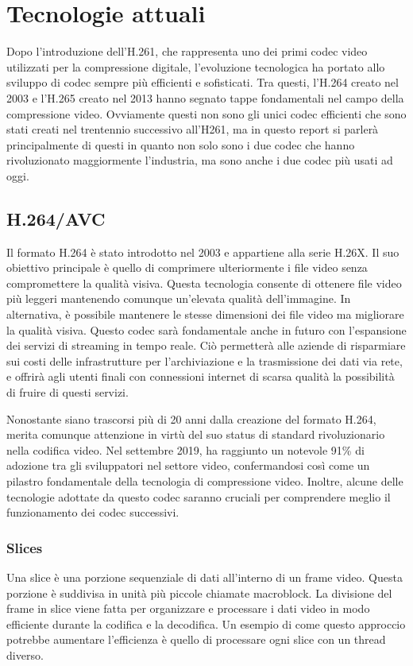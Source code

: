 \documentclass[a4paper,12pt, oneside]{article}
\begin{document}
\section{Tecnologie attuali}
Dopo l'introduzione dell'H.261, che rappresenta uno dei primi codec video utilizzati per la compressione
digitale, l'evoluzione tecnologica ha portato allo sviluppo di codec sempre più efficienti e sofisticati.
Tra questi, l'H.264 creato nel 2003 e l'H.265 creato nel 2013 hanno segnato tappe fondamentali nel campo
della compressione video. Ovviamente questi non sono gli unici codec efficienti che sono stati creati nel
trentennio successivo all'H261, ma in questo report si parlerà principalmente di questi in quanto non
solo sono i due codec che hanno rivoluzionato maggiormente l'industria, ma sono anche i due codec più
usati ad oggi.

\subsection{H.264/AVC}
Il formato H.264 è stato introdotto nel 2003 e appartiene alla serie H.26X. Il suo obiettivo principale
è quello di comprimere ulteriormente i file video senza compromettere la qualità visiva. Questa
tecnologia consente di ottenere file video più leggeri mantenendo comunque un'elevata qualità
dell'immagine. In alternativa, è possibile mantenere le stesse dimensioni dei file video ma migliorare
la qualità visiva. Questo codec sarà fondamentale anche in futuro con l'espansione dei servizi di
streaming in tempo reale. Ciò permetterà alle aziende di risparmiare sui costi delle infrastrutture
per l'archiviazione e la trasmissione dei dati via rete, e offrirà agli utenti finali con connessioni
internet di scarsa qualità la possibilità di fruire di questi servizi.

Nonostante siano trascorsi più di 20 anni dalla creazione del formato H.264, merita comunque attenzione
in virtù del suo status di standard rivoluzionario nella codifica video. Nel settembre 2019, ha
raggiunto un notevole 91\% di adozione tra gli sviluppatori nel settore video, confermandosi così come
un pilastro fondamentale della tecnologia di compressione video. Inoltre, alcune delle tecnologie
adottate da questo codec saranno cruciali per comprendere meglio il funzionamento dei codec successivi.

\subsubsection{Slices}
Una slice è una porzione sequenziale di dati all'interno di un frame video. Questa porzione è suddivisa
in unità più piccole chiamate macroblock. La divisione del frame in slice viene fatta per organizzare e
processare i dati video in modo efficiente durante la codifica e la decodifica. Un esempio di come
questo approccio potrebbe aumentare l'efficienza è quello di processare ogni slice con un thread diverso.
\end{document}
